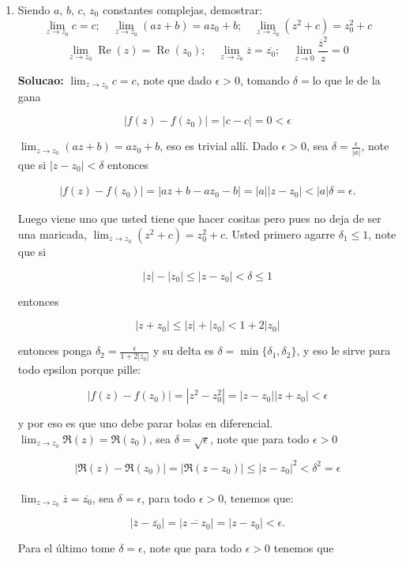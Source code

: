 \documentclass[11pt]{article}
\begin{document}
\begin{enumerate}
    \item Siendo $a$, $b$, $c$, $z_0$ constantes complejas, demostrar:
    \[
    \lim_{z \to z_0} c = c; \quad \lim_{z \to z_0} (a z + b) = a z_0 + b; \quad \lim_{z \to z_0} (z^2 + c) = z_0^2 + c
    \]
    \[
    \lim_{z \to z_0} \operatorname{Re}(z) = \operatorname{Re}(z_0); \quad \lim_{z \to z_0} \overline{z} = \overline{z_0}; \quad \lim_{z \to 0} \frac{\overline{z}^2}{z} = 0
    \]

\textbf{Solucao:} $\lim_{z \to z_0} c = c$, note que dado $\epsilon>0$, tomando $\delta=$lo que le de la gana

$$|f(z)-f(z_0)|=|c-c|=0<\epsilon$$

$\lim_{z\to z_0}(az+b)=az_0+b$, eso es trivial allí. Dado $\epsilon>0$, sea $\delta=\frac{\epsilon}{|a|}$, note que si $|z-z_0|<\delta$ entonces

\begin{align*}
  |f(z)-f(z_0)|=|az+b-az_0-b|=|a||z-z_0|<|a|\delta=\epsilon
.\end{align*}

Luego viene uno que usted tiene que hacer cositas pero pues no deja de ser una maricada, $\lim_{z\to z_0}(z^2+c)=z_0^2+c$. Usted primero agarre $\delta_1\leq 1$, note que si

$$|z|-|z_0|\leq|z-z_0|<\delta\leq1$$

entonces 

$$|z+z_0|\leq|z|+|z_0|<1+2|z_0|$$

entonces ponga $\delta_2=\frac{\epsilon}{1+2|z_0|}$ y su delta es $\delta=\min\{\delta_1,\delta_2\}$, y eso le sirve para todo epsilon porque pille:

$$|f(z)-f(z_0)|=|z^2-z_0^2|=|z-z_0||z+z_0|<\epsilon$$

y por eso es que uno debe parar bolas en diferencial.\\

$\lim_{z\to z_0}\Re(z)=\Re(z_0)$, sea $\delta=\sqrt{\epsilon}$, note que para todo $\epsilon>0$

$$|\Re(z)-\Re(z_0)|=|\Re(z-z_0)|\leq|z-z_0|^2<\delta^2=\epsilon$$\\

$\lim_{z \to z_0} \overline{z}=\overline{z_0}$, sea $\delta=\epsilon$, para todo $\epsilon>0$, tenemos que:

$$|\overline{z}-\overline{z_0}|=|\overline{z-z_0}|=|z-z_0|<\epsilon.$$

Para el último tome $\delta=\epsilon$, note que para todo $\epsilon>0$ tenemos que


\end{enumerate}
\end{document}
